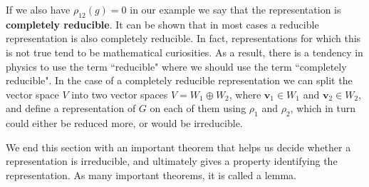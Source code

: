 \documentclass[notes.tex]{subfiles}
\begin{document}
If  we also have $\rho_{12}(g)=0$ in our example we say that the representation is {\bf completely reducible}. It can be shown that in most cases a reducible representation is also completely reducible. In fact, representations for which this is not true tend to be mathematical curiosities. As a result, there is a tendency in physics to use the term ``reducible" where we should use the term ``completely reducible". In the case of a completely reducible representation we can split the vector space $V$ into two vector spaces $V=W_1\oplus W_2$, where $\mathbf v_1\in W_1$ and $\mathbf v_2\in W_2$, and define a representation of $G$ on each of them using $\rho_1$ and $\rho_2$, which in turn could either be reduced more, or would be irreducible.

We end this section with an important theorem that helps us decide whether a representation is irreducible, and ultimately gives a property identifying the representation. As many important theorems, it is called a lemma.

%
%
%
%
%
\end{document}

